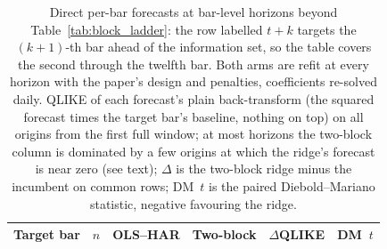 \begin{table}[H]
\centering
\caption{Direct per-bar forecasts at bar-level horizons beyond
Table~\ref{tab:block_ladder}: the row labelled $t+k$ targets the
$(k+1)$-th bar ahead of the information set, so the table covers the
second through the twelfth bar. Both arms are refit at every horizon
with the paper's design and penalties, coefficients re-solved daily.
QLIKE of each forecast's plain back-transform (the squared forecast
times the target bar's baseline, nothing on top) on all origins from
the first full window; at most horizons the two-block column is
dominated by a few origins at which the ridge's forecast is near zero
(see text);
$\Delta$ is the two-block ridge minus the incumbent on common
rows; DM~$t$ is the paired Diebold--Mariano statistic, negative
favouring the ridge.
\label{tab:dense_byk}}
\begin{tabular}{@{}lcccrr@{}}
\toprule
Target bar & $n$ & OLS--HAR & Two-block & $\Delta$QLIKE & DM~$t$ \\
\midrule

\end{tabular}
\end{table}
